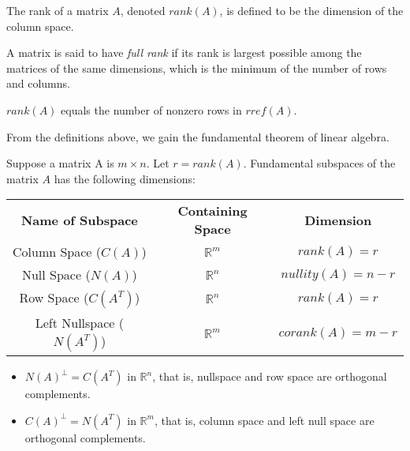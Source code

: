 \documentclass{report}
\begin{document}
	\begin{defn}
		The rank of a matrix $A$, denoted $rank(A)$, is defined to be the dimension of the column space.
	\end{defn}
	
	\begin{defn}
		A matrix is said to have \emph{full rank} if its rank is largest possible among the matrices of the same dimensions, which is the minimum of the number of rows and columns.
	\end{defn}
	
	\begin{thm}
		$rank(A)$ equals the number of nonzero rows in $rref(A)$.
	\end{thm}
	
	From the definitions above, we gain the fundamental theorem of linear algebra.
	
	\begin{thm}
		Suppose a matrix A is $m \times n$. Let $r=rank(A)$. Fundamental subspaces of the matrix $A$ has the following dimensions:
		
		\begin{tabular}{ccc}
			\textbf{Name of Subspace} & \textbf{Containing Space} & \textbf{Dimension} \\
			Column Space ($C(A)$)             & $\mathbb{R}^m$            & $rank(A)=r$        \\
			Null Space ($N(A)$)               & $\mathbb{R}^n$            & $nullity(A)=n-r$   \\
			Row Space ($C(A^T)$)              & $\mathbb{R}^n$            & $rank(A)=r$        \\
			Left Nullspace ($N(A^T)$)         & $\mathbb{R}^m$            & $corank(A)=m-r$   
		\end{tabular}
	\end{thm}
	
	\begin{thm}
		\begin{itemize}
			\item $N(A)^\perp=C(A^T)$ in $\mathbb{R}^n$, that is, nullspace and row space are orthogonal complements.
			\item $C(A)^\perp=N(A^T)$ in $\mathbb{R}^m$, that is, column space and left null space are orthogonal complements.
		\end{itemize}
	\end{thm}
	
\end{document}
